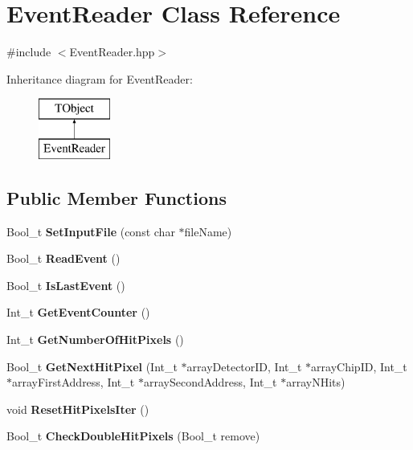 \hypertarget{class_event_reader}{}\section{Event\+Reader Class Reference}
\label{class_event_reader}


{\ttfamily \#include $<$Event\+Reader.\+hpp$>$}

Inheritance diagram for Event\+Reader\+:\begin{figure}[H]
\begin{center}
\leavevmode
\includegraphics[height=2.000000cm]{class_event_reader}
\end{center}
\end{figure}
\subsection*{Public Member Functions}
\begin{DoxyCompactItemize}
\item 
\mbox{\label{class_event_reader_a5cdb5f2917289e844712d36ac1b824d0}} 
Bool\+\_\+t {\bfseries Set\+Input\+File} (const char $\ast$file\+Name)
\item 
\mbox{\label{class_event_reader_a06bd8342adaa0f6c16582edfb9ea9db7}} 
Bool\+\_\+t {\bfseries Read\+Event} ()
\item 
\mbox{\label{class_event_reader_a5f403f1954a8d0efb384a5f680e011ee}} 
Bool\+\_\+t {\bfseries Is\+Last\+Event} ()
\item 
\mbox{\label{class_event_reader_afa588e79e61b7e2442e60501ec67872f}} 
Int\+\_\+t {\bfseries Get\+Event\+Counter} ()
\item 
\mbox{\label{class_event_reader_a70cdc9261406406bad39d1a767a931a2}} 
Int\+\_\+t {\bfseries Get\+Number\+Of\+Hit\+Pixels} ()
\item 
\mbox{\label{class_event_reader_ae34edd27c8906826a6483a49cfc6be4e}} 
Bool\+\_\+t {\bfseries Get\+Next\+Hit\+Pixel} (Int\+\_\+t $\ast$array\+Detector\+ID, Int\+\_\+t $\ast$array\+Chip\+ID, Int\+\_\+t $\ast$array\+First\+Address, Int\+\_\+t $\ast$array\+Second\+Address, Int\+\_\+t $\ast$array\+N\+Hits)
\item 
\mbox{\label{class_event_reader_a80faf6c115bb8f28e92efa7516a41bfc}} 
void {\bfseries Reset\+Hit\+Pixels\+Iter} ()
\item 
\mbox{\label{class_event_reader_ad7c0063d0bea5faf1125c4e594e89b83}} 
Bool\+\_\+t {\bfseries Check\+Double\+Hit\+Pixels} (Bool\+\_\+t remove)
\end{DoxyCompactItemize}
